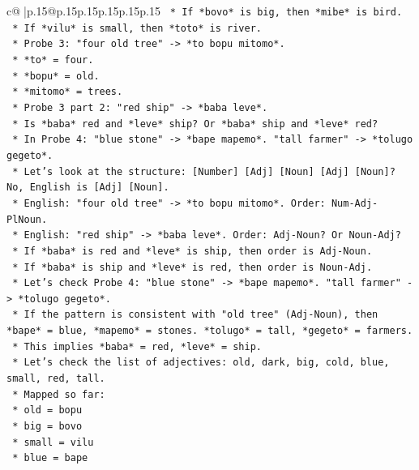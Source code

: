 \documentclass{article}
\begin{document}
{\begin{supertabular}{c@{$\;$}|p{.15\linewidth}@{}p{.15\linewidth}p{.15\linewidth}p{.15\linewidth}p{.15\linewidth}p{.15\linewidth}}
{{{\texttt{        *   If *bovo* is big, then *mibe* is bird.} \\
\texttt{        *   If *vilu* is small, then *toto* is river.} \\
\texttt{    *   Probe 3: "four old tree" {-}> *to bopu mitomo*.} \\
\texttt{        *   *to* = four.} \\
\texttt{        *   *bopu* = old.} \\
\texttt{        *   *mitomo* = trees.} \\
\texttt{    *   Probe 3 part 2: "red ship" {-}> *baba leve*.} \\
\texttt{        *   Is *baba* red and *leve* ship? Or *baba* ship and *leve* red?} \\
\texttt{        *   In Probe 4: "blue stone" {-}> *bape mapemo*. "tall farmer" {-}> *tolugo gegeto*.} \\
\texttt{        *   Let's look at the structure: {[}Number{]} {[}Adj{]} {[}Noun{]} {[}Adj{]} {[}Noun{]}? No, English is {[}Adj{]} {[}Noun{]}.} \\
\texttt{        *   English: "four old tree" {-}> *to bopu mitomo*. Order: Num{-}Adj{-}PlNoun.} \\
\texttt{        *   English: "red ship" {-}> *baba leve*. Order: Adj{-}Noun? Or Noun{-}Adj?} \\
\texttt{        *   If *baba* is red and *leve* is ship, then order is Adj{-}Noun.} \\
\texttt{        *   If *baba* is ship and *leve* is red, then order is Noun{-}Adj.} \\
\texttt{        *   Let's check Probe 4: "blue stone" {-}> *bape mapemo*. "tall farmer" {-}> *tolugo gegeto*.} \\
\texttt{        *   If the pattern is consistent with "old tree" (Adj{-}Noun), then *bape* = blue, *mapemo* = stones. *tolugo* = tall, *gegeto* = farmers.} \\
\texttt{        *   This implies *baba* = red, *leve* = ship.} \\
\texttt{        *   Let's check the list of adjectives: old, dark, big, cold, blue, small, red, tall.} \\
\texttt{        *   Mapped so far:} \\
\texttt{            *   old = bopu} \\
\texttt{            *   big = bovo} \\
\texttt{            *   small = vilu} \\
\texttt{            *   blue = bape} \\
}}}
\end{supertabular}}
\end{document}
